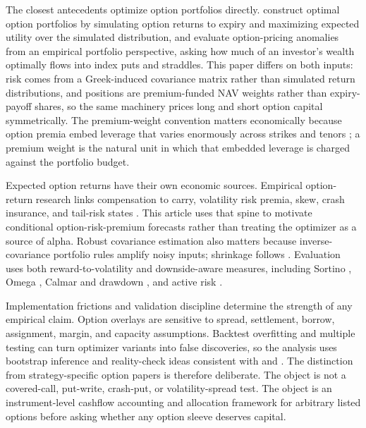 The closest antecedents optimize option portfolios directly.
\citet{faias_santaclara2017} construct optimal option portfolios by simulating option
returns to expiry and maximizing expected utility over the simulated distribution, and
\citet{driessen_maenhout2007} evaluate option-pricing anomalies from an empirical
portfolio perspective, asking how much of an investor's wealth optimally flows into index
puts and straddles. This paper differs on both inputs: risk comes from a Greek-induced
covariance matrix rather than simulated return distributions, and positions are
premium-funded NAV weights rather than expiry-payoff shares, so the same machinery prices
long and short option capital symmetrically. The premium-weight convention matters
economically because option premia embed leverage that varies enormously across strikes
and tenors \citep{frazzini_pedersen2022}; a premium weight is the natural unit in which
that embedded leverage is charged against the portfolio budget.

Expected option returns have their own economic sources. Empirical option-return research
links compensation to carry, volatility risk premia, skew, crash insurance, and tail-risk
states \citep{coval_shumway2001,bakshi_kapadia2003,carr_wu2009,
bollerslev_tauchen_zhou2009,broadie_chernov_johannes2009}. This article uses that spine to
motivate conditional option-risk-premium forecasts rather than treating the optimizer as a
source of alpha. Robust covariance estimation also matters because inverse-covariance
portfolio rules amplify noisy inputs; shrinkage follows \citet{ledoitwolf2004}. Evaluation
uses both reward-to-volatility and downside-aware measures, including Sortino
\citep{sortino_price1994}, Omega \citep{keating_shadwick2002}, Calmar and drawdown
\citep{magdon_ismail_atiya2004}, and active risk \citep{grinold_kahn2000}.

Implementation frictions and validation discipline determine the strength of any empirical
claim. Option overlays are sensitive to spread, settlement, borrow, assignment, margin, and
capacity assumptions. Backtest overfitting and multiple testing can turn optimizer variants
into false discoveries, so the analysis uses bootstrap inference and reality-check ideas
consistent with \citet{bailey2017pbo} and \citet{lopezdeprado2018}. The distinction from
strategy-specific option papers is therefore deliberate. The object is not a covered-call,
put-write, crash-put, or volatility-spread test. The object is an instrument-level cashflow
accounting and allocation framework for arbitrary listed options before asking whether any
option sleeve deserves capital.

